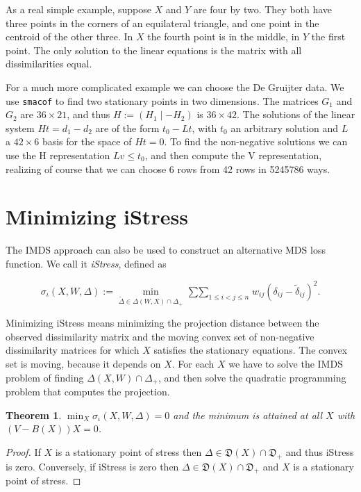 \documentclass[
  12pt,
]{book}
\newtheorem{theorem}{Theorem}[chapter]
\theoremstyle{definition}
\theoremstyle{definition}
\theoremstyle{definition}
\theoremstyle{definition}
\theoremstyle{remark}
\begin{document}
As a real simple example, suppose \(X\) and \(Y\) are four by two. They both have three points in the corners of an equilateral triangle, and one point in the centroid of the other three. In \(X\) the fourth point is in the middle, in \(Y\) the first point. The only solution to the linear equations is the matrix with all dissimilarities equal.

For a much more complicated example we can choose the De Gruijter data. We use \texttt{smacof} to find two stationary points in two dimensions. The matrices \(G_1\) and \(G_2\) are \(36\times 21\), and thus \(H:=(H_1\mid -H_2)\) is \(36\times 42\). The solutions of the linear system \(Ht=d_1-d_2\) are of the form
\(t_0-Lt\), with \(t_0\) an arbitrary solution and \(L\) a \(42\times 6\) basis for the space of \(Ht=0\). To find the non-negative solutions we can use the H representation \(Lv\leq t_0\), and then compute the V representation, realizing of course that we can choose 6 rows from 42 rows in 5245786 ways.

\hypertarget{minimizing-istress}{%
\section{Minimizing iStress}\label{minimizing-istress}}

The IMDS approach can also be used to construct an alternative MDS loss function. We call it \emph{iStress}, defined as

\[
\sigma_\iota(X,W,\Delta):=\min_{\tilde\Delta\in\Delta(W,X)\cap\Delta_+}\mathop{\sum\sum}_{1\leq i<j\leq n}w_{ij}(\delta_{ij}-\tilde\delta_{ij})^2.
\]

Minimizing iStress means minimizing the projection distance between the observed dissimilarity matrix and the moving convex set of non-negative dissimilarity matrices for which \(X\) satisfies the stationary equations. The convex set is moving, because it depends on \(X\). For each \(X\) we have to solve the IMDS problem of finding \(\Delta(X,W)\cap\Delta_+\), and then solve the quadratic programming problem that computes the projection.

\begin{theorem}
\protect\hypertarget{thm:invistress}{}{\label{thm:invistress} }\(\min_X\sigma_\iota(X,W,\Delta)=0\) and the minimum is attained at all \(X\) with \((V-B(X))X=0\).
\end{theorem}

\begin{proof}
If \(X\) is a stationary point of stress then \(\Delta\in\mathfrak{D}(X)\cap\mathfrak{D}_+\) and thus iStress is zero. Conversely, if iStress is zero then \(\Delta\in\mathfrak{D}(X)\cap\mathfrak{D}_+\) and \(X\) is a stationary point of stress.
\end{proof}
\end{document}
